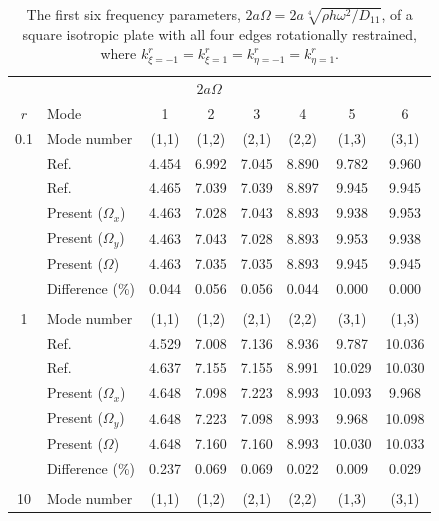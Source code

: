 \documentclass[preprint,12pt]{elsarticle}
\begin{document}
\begin{table}[!htbp]
	\centering
	\caption{The first six frequency parameters, $2a\Omega = 2a\sqrt[4]{\rho h \omega^2/D_{11}}$, of a square isotropic plate with all four edges rotationally restrained, where $k^r_{\xi=-1} = k^r_{\xi=1} = k^r_{\eta=-1} = k^r_{\eta=1}$.}
	\begin{tabular}{c l c c c c c c}
		\toprule
		\multicolumn{1}{c}{} & \multicolumn{6}{c}{$2a\Omega$} \\ 
		\cmidrule(lr){3-8}
		$r$ & Mode & 1 & 2 & 3 & 4 & 5 & 6 \\ 
		\midrule
		0.1 & Mode number   & (1,1) & (1,2) & (2,1) & (2,2) & (1,3) & (3,1) \\
		& Ref.\Citealp{mukhopadhyay1979free} & 4.454 & 6.992 & 7.045 & 8.890  & 9.782  & 9.960 \\
		& Ref.\Citealp{zhang2019new} & 4.465 & 7.039 & 7.039 &8.897  &9.945& 9.945 \\
		& Present ($\Omega_x$)   & 4.463     & 7.028     & 7.043     & 8.893     & 9.938       & 9.953  \\
		& Present ($\Omega_y$)   & 4.463    &7.043     &  7.028       & 8.893   &  9.953    & 9.938 \\ 
		& Present ($\Omega$)   & 4.463    & 7.035     & 7.035      &8.893     & 9.945     & 9.945   \\
		&Difference (\%)& 0.044     & 0.056      & 0.056      & 0.044     &  0.000     & 0.000
		\\
		\\
		1 & Mode number   &  (1,1) & (1,2) & (2,1) & (2,2) & (3,1) & (1,3) \\
		& Ref.\Citealp{mukhopadhyay1979free} & 4.529& 7.008 &7.136 &8.936& 9.787& 10.036 \\
		& Ref.\Citealp{zhang2019new} & 4.637 &7.155 & 7.155 & 8.991 & 10.029 & 10.030 \\
		& Present ($\Omega_x$)   & 4.648     & 7.098      &7.223     & 8.993     &   10.093    & 9.968  \\
		& Present ($\Omega_y$)   & 4.648     & 7.223     & 7.098       & 8.993     &   9.968     & 10.098
		\\ 
		& Present ($\Omega$)   & 4.648      & 7.160   & 7.160     & 8.993    &   10.030   & 10.033   \\
		&Difference (\%)& 0.237    & 0.069      & 0.069      & 0.022     &  0.009     &0.029
		\\
		\\
		10 & Mode number   &  (1,1) & (1,2) & (2,1) & (2,2) & (1,3) & (3,1) \\

\end{tabular}
\end{table}
\end{document}
